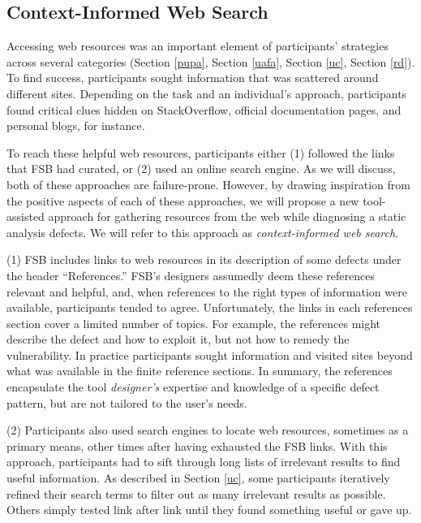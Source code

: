 \documentclass[10pt,journal,compsoc]{IEEEtran}
\begin{document}
\subsection{Context-Informed Web Search}
Accessing web resources was an important element of participants' strategies across several categories (Section \ref{pupa}, Section \ref{uafa}, Section \ref{uc}, Section \ref{rd}).
To find success, participants sought information that was scattered around different sites.
Depending on the task and an individual's approach, participants found critical clues hidden on StackOverflow, official documentation pages, and personal blogs, for instance. 

To reach these helpful web resources, participants either (1) followed the links that FSB had curated, or (2) used an online search engine. As we will discuss, both of these approaches are failure-prone.
However, by drawing inspiration from the positive aspects of each of these approaches, we will propose a new tool-assisted approach for gathering resources from the web while diagnosing a static analysis defects. 
We will refer to this approach as \textit{context-informed web search}.

(1)
FSB includes links to web resources in its description of some defects under the header ``References.''
FSB's designers assumedly deem these references relevant and helpful, and, when references to the right types of information were available, participants tended to agree.
Unfortunately, the links in each references section cover a limited number of topics.
For example, the references might describe the defect and how to exploit it, but not how to remedy the vulnerability.
In practice participants sought information and visited sites beyond what was available in the finite reference sections.
In summary, the references encapsulate the tool \textit{designer's} expertise and knowledge of a specific defect pattern, but are not tailored to the user's needs.


(2)
Participants also used search engines to locate web resources, sometimes as a primary means, other times after having exhausted the FSB links.
With this approach, participants had to sift through long lists of irrelevant results to find useful information.
As described in Section \ref{uc}, some participants iteratively refined their search terms to filter out as many irrelevant results as possible.
Others simply tested link after link until they found something useful or gave up.
\end{document}
